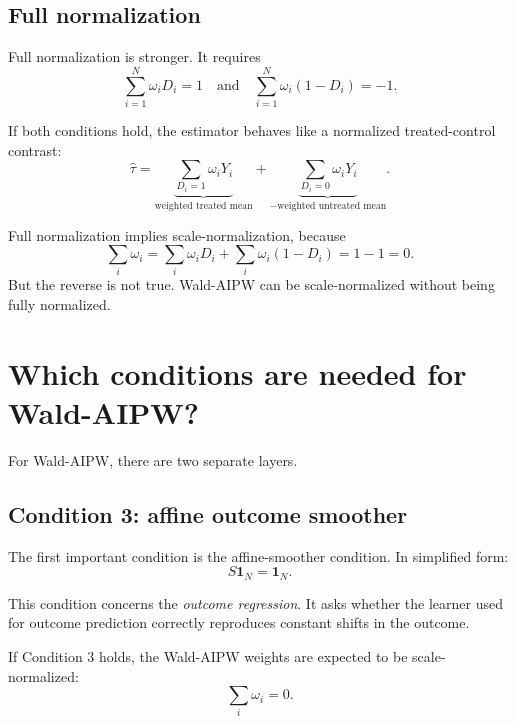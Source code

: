 \documentclass[11pt,a4paper]{article}
\begin{document}
\subsection{Full normalization}

Full normalization is stronger. It requires
\begin{equation}
    \sum_{i=1}^N \omega_iD_i = 1
    \quad\text{and}\quad
    \sum_{i=1}^N \omega_i(1-D_i) = -1.
    \label{eq:full_norm}
\end{equation}

If both conditions hold, the estimator behaves like a normalized treated-control
contrast:
\begin{equation}
    \hat\tau
    =
    \underbrace{\sum_{D_i=1}\omega_iY_i}_{\text{weighted treated mean}}
    +
    \underbrace{\sum_{D_i=0}\omega_iY_i}_{-\text{weighted untreated mean}}.
\end{equation}

Full normalization implies scale-normalization, because
\begin{equation}
    \sum_i\omega_i
    =
    \sum_i\omega_iD_i+\sum_i\omega_i(1-D_i)
    =
    1-1
    =
    0.
\end{equation}
But the reverse is not true. Wald-AIPW can be scale-normalized without being fully
normalized.

\section{Which conditions are needed for Wald-AIPW?}

For Wald-AIPW, there are two separate layers.

\subsection{Condition 3: affine outcome smoother}

The first important condition is the affine-smoother condition. In simplified
form:
\begin{equation}
    S\mathbf{1}_N=\mathbf{1}_N.
\end{equation}

This condition concerns the \emph{outcome regression}. It asks whether the learner
used for outcome prediction correctly reproduces constant shifts in the outcome.

If Condition 3 holds, the Wald-AIPW weights are expected to be scale-normalized:
\begin{equation}
    \sum_i\omega_i=0.
\end{equation}
\end{document}
